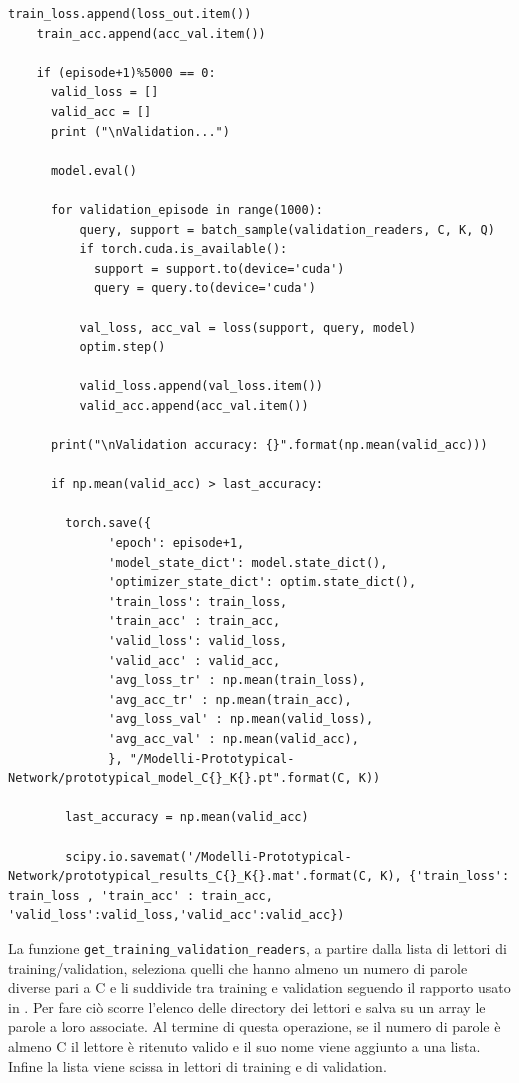 \documentclass[12pt,a4paper,titlepage]{article}
\begin{document}
\begin{lstlisting}[language=iPython,firstnumber=1, caption=protonet\_training.py, label=protonet_training main,captionpos=b]
    train_loss.append(loss_out.item())
    train_acc.append(acc_val.item())
    
    if (episode+1)%5000 == 0:
      valid_loss = []
      valid_acc = []
      print ("\nValidation...")

      model.eval()

      for validation_episode in range(1000):
          query, support = batch_sample(validation_readers, C, K, Q)
          if torch.cuda.is_available():
            support = support.to(device='cuda')
            query = query.to(device='cuda')
          
          val_loss, acc_val = loss(support, query, model)
          optim.step()
          
          valid_loss.append(val_loss.item())
          valid_acc.append(acc_val.item())

      print("\nValidation accuracy: {}".format(np.mean(valid_acc)))

      if np.mean(valid_acc) > last_accuracy: 

        torch.save({
              'epoch': episode+1,
              'model_state_dict': model.state_dict(),
              'optimizer_state_dict': optim.state_dict(),
              'train_loss': train_loss,
              'train_acc' : train_acc,              
              'valid_loss': valid_loss,
              'valid_acc' : valid_acc,
              'avg_loss_tr' : np.mean(train_loss),
              'avg_acc_tr' : np.mean(train_acc),
              'avg_loss_val' : np.mean(valid_loss),
              'avg_acc_val' : np.mean(valid_acc),
              }, "/Modelli-Prototypical-Network/prototypical_model_C{}_K{}.pt".format(C, K))
        
        last_accuracy = np.mean(valid_acc)

        scipy.io.savemat('/Modelli-Prototypical-Network/prototypical_results_C{}_K{}.mat'.format(C, K), {'train_loss': train_loss , 'train_acc' : train_acc, 'valid_loss':valid_loss,'valid_acc':valid_acc})
\end{lstlisting}

La funzione \texttt{get\_training\_validation\_readers}, a partire dalla lista di lettori di training/validation, seleziona quelli che hanno almeno un numero di parole diverse pari a C e li suddivide tra training e validation seguendo il rapporto usato in \cite{salamon:Few-Shot}.
Per fare ciò scorre l'elenco delle directory dei lettori e salva su un array le parole a loro associate. Al termine di questa operazione, se il numero di parole è almeno C il lettore è ritenuto valido e il suo nome viene aggiunto a una lista. Infine la lista viene scissa in lettori di training e di validation. 
\end{document}
